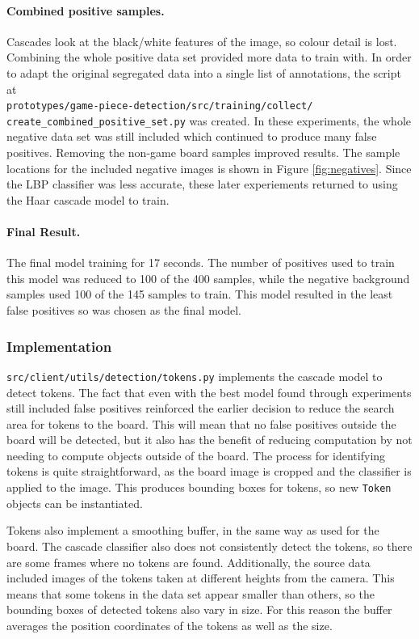 \documentclass[12pt]{article}
\begin{document}
\paragraph{Combined positive samples.} Cascades look at the black/white features of the image, so colour detail is lost. 
Combining the whole positive data set provided more data to train with. 
In order to adapt the original segregated data into a single list of annotations, the script at \\
\texttt{prototypes/game-piece-detection/src/training/collect/\\create\_combined\_positive\_set.py} was created. 
In these experiments, the whole negative data set was still included which continued to produce many false positives. 
Removing the non-game board samples improved results. 
The sample locations for the included negative images is shown in Figure \ref{fig:negatives}.
Since the LBP classifier was less accurate, these later experiements returned to using the Haar cascade model to train. 

\paragraph{Final Result.} The final model training for 17 seconds. 
The number of positives used to train this model was reduced to 100 of the 400 samples, while the negative background samples used 100 of the 145 samples to train. 
This model resulted in the least false positives so was chosen as the final model. 

\subsubsection{Implementation}
\texttt{src/client/utils/detection/tokens.py} implements the cascade model to detect tokens. 
The fact that even with the best model found through experiments still included false positives reinforced the earlier decision to reduce the search area for tokens to the board. 
This will mean that no false positives outside the board will be detected, but it also has the benefit of reducing computation by not needing to compute objects outside of the board. 
The process for identifying tokens is quite straightforward, as the board image is cropped and the classifier is applied to the image. 
This produces bounding boxes for tokens, so new \texttt{Token} objects can be instantiated.

Tokens also implement a smoothing buffer, in the same way as used for the board. 
The cascade classifier also does not consistently detect the tokens, so there are some frames where no tokens are found. 
Additionally, the source data included images of the tokens taken at different heights from the camera. 
This means that some tokens in the data set appear smaller than others, so the bounding boxes of detected tokens also vary in size. 
For this reason the buffer averages the position coordinates of the tokens as well as the size. 
\end{document}
